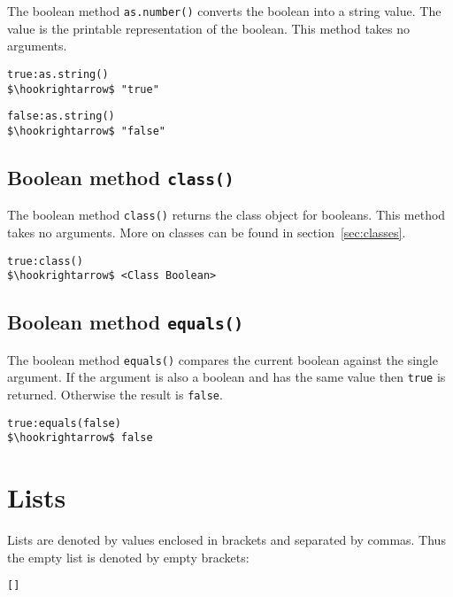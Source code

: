\documentclass[11pt,a4paper]{scrbook}
\begin{document}
The boolean method \texttt{as.number()} converts the boolean into a string
value. The value is the printable representation of the boolean. This method
takes no arguments.

\begin{lstlisting}[language=BibTool,mathescape=true]
true:as.string()
$\hookrightarrow$ "true"
\end{lstlisting}

\begin{lstlisting}[language=BibTool,mathescape=true]
false:as.string()
$\hookrightarrow$ "false"
\end{lstlisting}

\subsection{Boolean method \texttt{class()}}

The boolean method \texttt{class()} returns the class object for booleans.
This method takes no arguments. More on classes can be found in
section~\ref{sec:classes}.

\begin{lstlisting}[language=BibTool,mathescape=true]
true:class()
$\hookrightarrow$ <Class Boolean>
\end{lstlisting}

\subsection{Boolean method \texttt{equals()}}

The boolean method \texttt{equals()} compares the current boolean against the
single argument. If the argument is also a boolean and has the same value then
\verb|true| is returned. Otherwise the result is \verb|false|.

\begin{lstlisting}[language=BibTool,mathescape=true]
true:equals(false)
$\hookrightarrow$ false
\end{lstlisting}



\section{Lists}

Lists are denoted by values enclosed in brackets and separated by commas.
Thus the empty list is denoted by empty brackets:

\begin{lstlisting}[language=BibTool,mathescape=true]
[]
\end{lstlisting}
\end{document}
